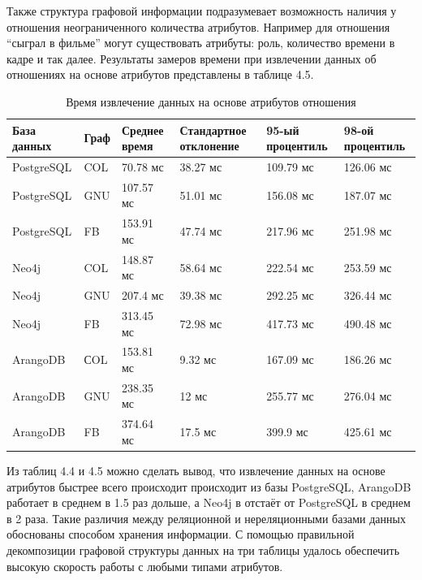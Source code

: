 Также структура графовой информации подразумевает возможность наличия у отношения неограниченного количества атрибутов. Например для
отношения “сыграл в фильме” могут существовать атрибуты: роль, количество времени в кадре и так далее. Результаты замеров времени при
извлечении данных об отношениях на основе атрибутов представлены в таблице 4.5.

\begin{table} [htbp]
    \centering\small
    \caption{Время извлечение данных на основе атрибутов отношения}
    \begin{tabular}{|p{3cm}|p{1cm}|p{2cm}|p{2cm}|p{2cm}|p{2cm}|}
        \hline
        База данных & Граф & Среднее время & Стандартное отклонение & 95-ый процентиль & 98-ой процентиль \\ \hline
        PostgreSQL  & COL  & 70.78 мс      & 38.27 мс               & 109.79 мс        & 126.06 мс        \\ \hline
        PostgreSQL  & GNU  & 107.57 мс     & 51.01 мс               & 156.08 мс        & 187.07 мс        \\ \hline
        PostgreSQL  & FB   & 153.91 мс     & 47.74 мс               & 217.96 мс        & 251.98 мс        \\ \hline
        Neo4j       & COL  & 148.87 мс     & 58.64 мс               & 222.54 мс        & 253.59 мс        \\ \hline
        Neo4j       & GNU  & 207.4 мс      & 39.38 мс               & 292.25 мс        & 326.44 мс        \\ \hline
        Neo4j       & FB   & 313.45 мс     & 72.98 мс               & 417.73 мс        & 490.48 мс        \\ \hline
        ArangoDB    & СOL  & 153.81 мс     & 9.32 мс                & 167.09 мс        & 186.26 мс        \\ \hline
        ArangoDB    & GNU  & 238.35 мс     & 12 мс                  & 255.77 мс        & 276.04 мс        \\ \hline
        ArangoDB    & FB   & 374.64 мс     & 17.5 мс                & 399.9 мс         & 425.61 мс        \\ \hline
    \end{tabular}
    \normalsize
\end{table}

Из таблиц 4.4 и 4.5 можно сделать вывод, что извлечение данных на основе атрибутов быстрее всего происходит происходит из базы PostgreSQL,
ArangoDB работает в среднем в 1.5 раз дольше, а Neo4j в отстаёт от PostgreSQL в среднем в 2 раза. Такие различия между реляционной и
нереляционными базами данных обоснованы способом хранения информации. С помощью правильной декомпозиции графовой структуры данных на три
таблицы удалось обеспечить высокую скорость работы с любыми типами атрибутов.

